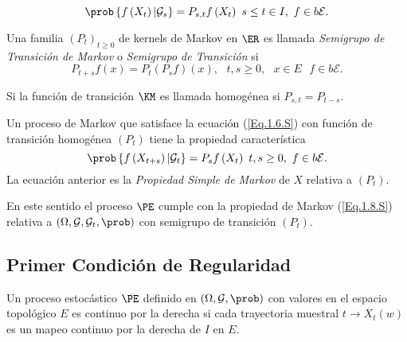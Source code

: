 \begin{equation}\label{Eq.1.6.S}
\prob\left\{f\left(X_{t}\right)|\mathcal{G}_{s}\right\}=P_{s,t}f\left(X_{t}\right)\textrm{ }s\leq t\in I,\textrm{ }f\in b\mathcal{E}.
\end{equation}

\begin{Def}
Una familia $\left(P_{t}\right)_{t\geq0}$ de kernels de Markov en $\ER$ es llamada {\em Semigrupo de Transici\'on de Markov} o {\em Semigrupo de Transici\'on} si
\[P_{t+s}f\left(x\right)=P_{t}\left(P_{s}f\right)\left(x\right),\textrm{ }t,s\geq0,\textrm{ }x\in E\textrm{ }f\in b\mathcal{E}.\]
\end{Def}
\begin{Note}
Si la funci\'on de transici\'on $\KM$ es llamada homog\'enea si $P_{s,t}=P_{t-s}$.
\end{Note}

Un proceso de Markov que satisface la ecuaci\'on (\ref{Eq.1.6.S}) con funci\'on de transici\'on homog\'enea $\left(P_{t}\right)$ tiene la propiedad caracter\'istica
\begin{equation}\label{Eq.1.8.S}
\prob\left\{f\left(X_{t+s}\right)|\mathcal{G}_{t}\right\}=P_{s}f\left(X_{t}\right)\textrm{ }t,s\geq0,\textrm{ }f\in b\mathcal{E}.
\end{equation}
La ecuaci\'on anterior es la {\em Propiedad Simple de Markov} de $X$ relativa a $\left(P_{t}\right)$.

En este sentido el proceso $\PE$ cumple con la propiedad de Markov (\ref{Eq.1.8.S}) relativa a $\left(\Omega,\mathcal{G},\mathcal{G}_{t},\prob\right)$ con semigrupo de transici\'on $\left(P_{t}\right)$.
\subsection{Primer Condici\'on de Regularidad}
\begin{Def}
Un proceso estoc\'astico $\PE$ definido en $\left(\Omega,\mathcal{G},\prob\right)$ con valores en el espacio topol\'ogico $E$ es continuo por la derecha si cada trayectoria muestral $t\rightarrow X_{t}\left(w\right)$ es un mapeo continuo por la derecha de $I$ en $E$.
\end{Def}


